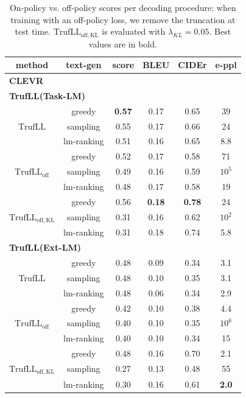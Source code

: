 \documentclass{article}
\newcommand{\algo}{TrufLL\xspace}
\begin{document}
\begin{table}[h!]
\caption{\small On-policy vs. off-policy scores per decoding procedure: when training with an off-policy loss, we remove the truncation at test time. $\mathrm{\algo}_{\mathrm{off,KL}}$ is evaluated with $\lambda_{KL}=0.05$. Best values are in bold.}
\label{app:table:abl:onpolicy_offpolicy_textgen}
\centering 
\small
\begin{tabularx}{0.6\textwidth}{cc|c|ccc}
method & text-gen & score & BLEU & CIDEr
& e-ppl \\\toprule
\multicolumn{6}{l}{\textbf{CLEVR}} \\
\hline
\hline
\multicolumn{4}{l}{\textbf{\algo(Task-LM)}} \\
\hline
& greedy & \textbf{0.57} & 0.17 & 0.65 & 39 \\
$\mathrm{\algo}$ & sampling & 0.55 & 0.17 & 0.66 & 24 \\
              & lm-ranking & 0.51 & 0.16 & 0.65 & 8.8 \\
\hline
\hline
& greedy & 0.52 & 0.17 &  0.58 & 71 \\
$\mathrm{\algo}_{\mathrm{off}}$ & sampling & 0.49 & 0.16 & 0.59 & $10^5$ \\
                 & lm-ranking & 0.48 & 0.17 & 0.58 & 19 \\
\hline
& greedy & 0.56 & \textbf{0.18} & \textbf{0.78} & 24 \\
$\mathrm{\algo}_{\mathrm{off,KL}}$ & sampling & 0.31 & 0.16 & 0.62 &$10^2$ \\
                 & lm-ranking & 0.31 & 0.18 & 0.74 & 5.8 \\
\midrule
\multicolumn{4}{l}{\textbf{\algo(Ext-LM)}} \\
\midrule
 & greedy & 0.48 &	0.09 &	0.34 & 3.1 \\
\algo & sampling & 0.48&	0.10 &	0.35 &	3.1 \\
            & lm-ranking & 0.48 & 0.06 & 0.34 & 2.9 \\
\hline
\hline
& greedy & 0.42 &  0.10 &  0.38 &  4.4 \\
$\mathrm{\algo}_{\mathrm{off}}$ & sampling & 0.40 & 0.10 & 0.35 & $10^6$ \\
            & lm-ranking & 0.40 & 0.10 & 0.34 & 15 \\
\hline
& greedy & 0.48 & 0.16 & 0.70 & 2.1 \\
$\mathrm{\algo}_{\mathrm{off,KL}}$ & sampling & 0.27 & 0.13 & 0.48 & 55 \\
                 & lm-ranking &0.30 & 0.16 & 0.61 & \textbf{2.0} \\

\end{tabularx}
\end{table}
\end{document}
